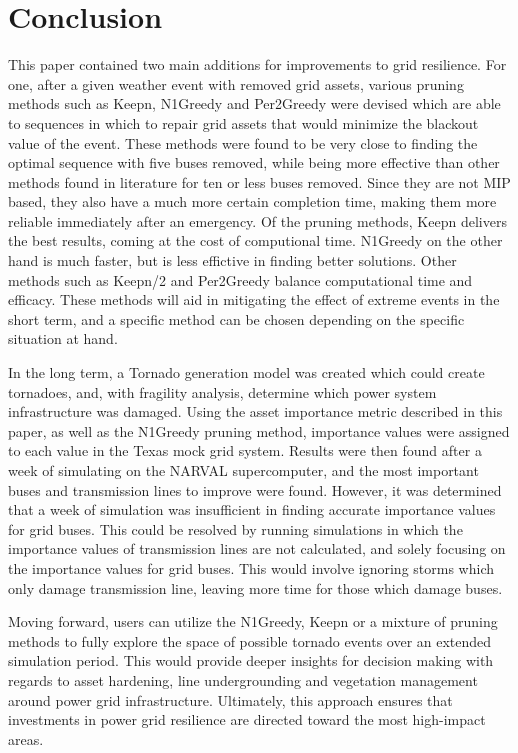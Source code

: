 \documentclass[12pt]{article}
\begin{document}
\section{Conclusion}
This paper contained two main additions for improvements to grid resilience. For one, after a given weather event with removed grid assets, various pruning methods such as Keepn, N1Greedy and Per2Greedy were devised which are able to sequences in which to repair grid assets that would minimize the blackout value of the event. These methods were found to be very close to finding the optimal sequence with five buses removed, while being more effective than other methods found in literature for ten or less buses removed. Since they are not MIP based, they also have a much more certain completion time, making them more reliable immediately after an emergency. Of the pruning methods, Keepn delivers the best results, coming at the cost of computional time. N1Greedy on the other hand is much faster, but is less effictive in finding better solutions. Other methods such as Keepn/2 and Per2Greedy balance computational time and efficacy. These methods will aid in mitigating the effect of extreme events in the short term, and a specific method can be chosen depending on the specific situation at hand. \par
In the long term, a Tornado generation model was created which could create tornadoes, and, with fragility analysis, determine which power system infrastructure was damaged. Using the asset importance metric described in this paper, as well as the N1Greedy pruning method, importance values were assigned to each value in the Texas mock grid system. Results were then found after a week of simulating on the NARVAL supercomputer, and the most important buses and transmission lines to improve were found. However, it was determined that a week of simulation was insufficient in finding accurate importance values for grid buses. This could be resolved by running simulations in which the importance values of transmission lines are not calculated, and solely focusing on the importance values for grid buses. This would involve ignoring storms which only damage transmission line, leaving more time for those which damage buses. \par
Moving forward, users can utilize the N1Greedy, Keepn or a mixture of pruning methods to fully explore the space of possible tornado events over an extended simulation period. This would provide deeper insights for decision making with regards to asset hardening, line undergrounding and vegetation management around power grid infrastructure. Ultimately, this approach ensures that investments in power grid resilience are directed toward the most high-impact areas. \par
\end{document}
